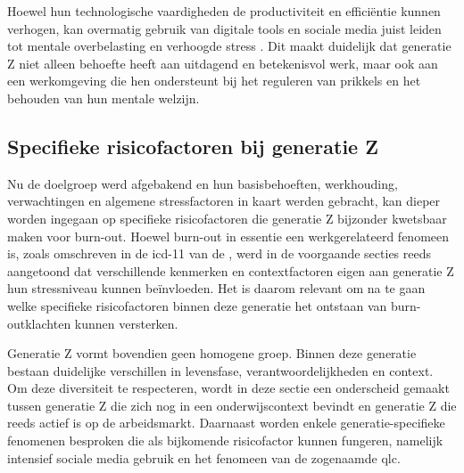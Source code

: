 \vspace{1em}

Hoewel hun technologische vaardigheden de productiviteit en efficiëntie kunnen verhogen, kan overmatig gebruik van digitale tools en sociale media juist leiden tot mentale overbelasting en verhoogde stress \autocite{Zahra2025}. Dit maakt duidelijk dat generatie Z niet alleen behoefte heeft aan uitdagend en betekenisvol werk, maar ook aan een werkomgeving die hen ondersteunt bij het reguleren van prikkels en het behouden van hun mentale welzijn.

\vspace{1em}



\subsection{Specifieke risicofactoren bij generatie Z}
\label{subsec:risicofactoren-twintigers}

\vspace{1em}

Nu de doelgroep werd afgebakend en hun basisbehoeften, werkhouding, verwachtingen en algemene stressfactoren in kaart werden gebracht, kan dieper worden ingegaan op specifieke risicofactoren die generatie Z bijzonder kwetsbaar maken voor burn-out. Hoewel burn-out in essentie een werkgerelateerd fenomeen is, zoals omschreven in de \acrshort{icd}-11 van de \textcite{WHOW2019}, werd in de voorgaande secties reeds aangetoond dat verschillende kenmerken en contextfactoren eigen aan generatie Z hun stressniveau kunnen beïnvloeden. Het is daarom relevant om na te gaan welke specifieke risicofactoren binnen deze generatie het ontstaan van burn-outklachten kunnen versterken.

\vspace{1em}

Generatie Z vormt bovendien geen homogene groep. Binnen deze generatie bestaan duidelijke verschillen in levensfase, verantwoordelijkheden en context. Om deze diversiteit te respecteren, wordt in deze sectie een onderscheid gemaakt tussen generatie Z die zich nog in een onderwijscontext bevindt en generatie Z die reeds actief is op de arbeidsmarkt. Daarnaast worden enkele generatie-specifieke fenomenen besproken die als bijkomende risicofactor kunnen fungeren, namelijk intensief sociale media gebruik en het fenomeen van de zogenaamde \acrlong{qlc}. 

\vspace{1em}

